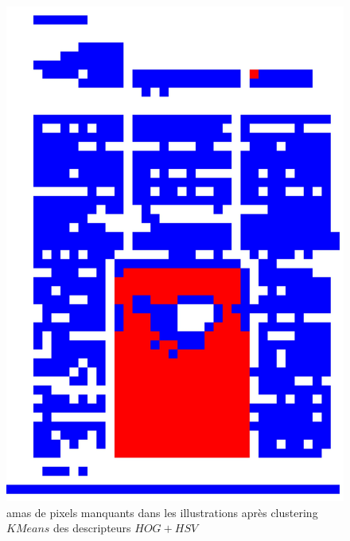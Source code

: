 \documentclass{book}
\begin{document}
\begin{figure}[H]
\begin{center}
\includegraphics[scale=0.06]{images/rect_50_res_hog_hsv_kmeans.jpg}
\end{center}
\caption{amas de pixels manquants dans les illustrations après clustering $KMeans$ des descripteurs $HOG+HSV$}
\label{rect2}
\end{figure}
\end{document}
